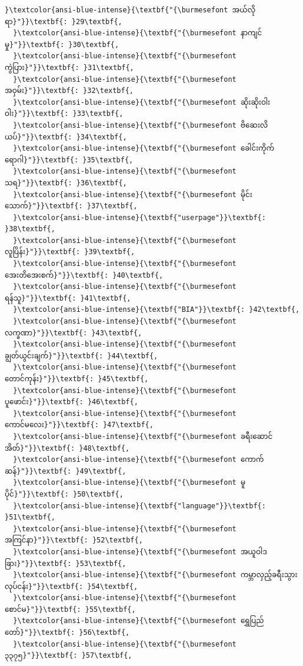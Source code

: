 \documentclass[11pt]{article}
\begin{document}
\begin{Verbatim}[commandchars=\\\{\}]
  }\textcolor{ansi-blue-intense}{\textbf{"{\burmesefont အယ်လိုရာ}"}}\textbf{: }29\textbf{,
  }\textcolor{ansi-blue-intense}{\textbf{"{\burmesefont နာကျင်မှု}"}}\textbf{: }30\textbf{,
  }\textcolor{ansi-blue-intense}{\textbf{"{\burmesefont ကွဲပြား}"}}\textbf{: }31\textbf{,
  }\textcolor{ansi-blue-intense}{\textbf{"{\burmesefont အဝှမ်း}"}}\textbf{: }32\textbf{,
  }\textcolor{ansi-blue-intense}{\textbf{"{\burmesefont ဆိုးဆိုးဝါးဝါး}"}}\textbf{: }33\textbf{,
  }\textcolor{ansi-blue-intense}{\textbf{"{\burmesefont ဗိဆေးလိယပ်}"}}\textbf{: }34\textbf{,
  }\textcolor{ansi-blue-intense}{\textbf{"{\burmesefont ခေါင်းကိုက်ရောဂါ}"}}\textbf{: }35\textbf{,
  }\textcolor{ansi-blue-intense}{\textbf{"{\burmesefont သရ}"}}\textbf{: }36\textbf{,
  }\textcolor{ansi-blue-intense}{\textbf{"{\burmesefont မိုင်းသောက်}"}}\textbf{: }37\textbf{,
  }\textcolor{ansi-blue-intense}{\textbf{"userpage"}}\textbf{: }38\textbf{,
  }\textcolor{ansi-blue-intense}{\textbf{"{\burmesefont လူပြိန်း}"}}\textbf{: }39\textbf{,
  }\textcolor{ansi-blue-intense}{\textbf{"{\burmesefont အေးတိအေးစက်}"}}\textbf{: }40\textbf{,
  }\textcolor{ansi-blue-intense}{\textbf{"{\burmesefont ရန်သူ}"}}\textbf{: }41\textbf{,
  }\textcolor{ansi-blue-intense}{\textbf{"BIA"}}\textbf{: }42\textbf{,
  }\textcolor{ansi-blue-intense}{\textbf{"{\burmesefont လက္ခဏာ}"}}\textbf{: }43\textbf{,
  }\textcolor{ansi-blue-intense}{\textbf{"{\burmesefont ချွတ်ယွင်းချက်}"}}\textbf{: }44\textbf{,
  }\textcolor{ansi-blue-intense}{\textbf{"‌{\burmesefont တောင်ကုန်း}"}}\textbf{: }45\textbf{,
  }\textcolor{ansi-blue-intense}{\textbf{"{\burmesefont ပူဖောင်း}"}}\textbf{: }46\textbf{,
  }\textcolor{ansi-blue-intense}{\textbf{"‌‌{\burmesefont ကောင်မလေး}"}}\textbf{: }47\textbf{,
  }\textcolor{ansi-blue-intense}{\textbf{"{\burmesefont ခရီးဆောင်အိတ်}"}}\textbf{: }48\textbf{,
  }\textcolor{ansi-blue-intense}{\textbf{"{\burmesefont ကောက်ဆန်}"}}\textbf{: }49\textbf{,
  }\textcolor{ansi-blue-intense}{\textbf{"{\burmesefont မူပိုင်}"}}\textbf{: }50\textbf{,
  }\textcolor{ansi-blue-intense}{\textbf{"language"}}\textbf{: }51\textbf{,
  }\textcolor{ansi-blue-intense}{\textbf{"{\burmesefont အကြင်နာ}"}}\textbf{: }52\textbf{,
  }\textcolor{ansi-blue-intense}{\textbf{"{\burmesefont အယူဝါဒခြား}"}}\textbf{: }53\textbf{,
  }\textcolor{ansi-blue-intense}{\textbf{"{\burmesefont ကမ္ဘာလှည့်ခရီးသွားလုပ်ငန်း}"}}\textbf{: }54\textbf{,
  }\textcolor{ansi-blue-intense}{\textbf{"{\burmesefont စောင်မ}"}}\textbf{: }55\textbf{,
  }\textcolor{ansi-blue-intense}{\textbf{"{\burmesefont ရွှေပြည်တော်}"}}\textbf{: }56\textbf{,
  }\textcolor{ansi-blue-intense}{\textbf{"{\burmesefont ၃၃၇၅}"}}\textbf{: }57\textbf{,

\end{Verbatim}
\end{document}

